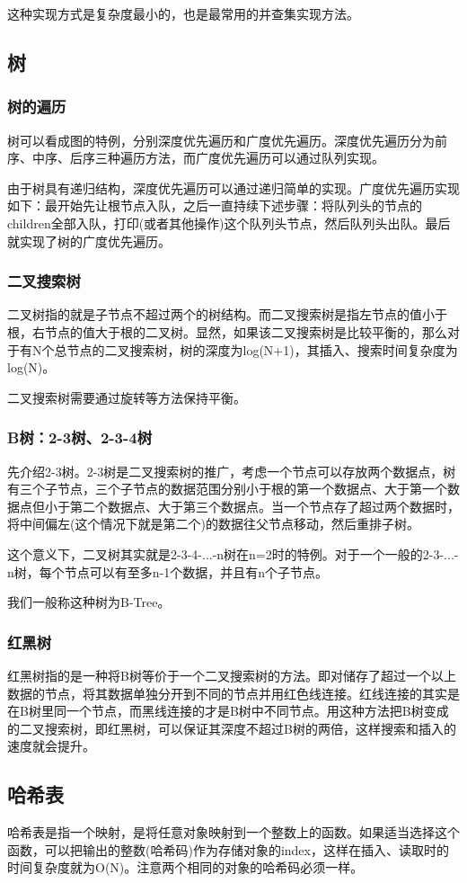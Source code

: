 \documentclass{article}
\begin{document}
	这种实现方式是复杂度最小的，也是最常用的并查集实现方法。
	\subsection{树}
	\subsubsection{树的遍历}
	树可以看成图的特例，分别深度优先遍历和广度优先遍历。深度优先遍历分为前序、中序、后序三种遍历方法，而广度优先遍历可以通过队列实现。
	
	由于树具有递归结构，深度优先遍历可以通过递归简单的实现。广度优先遍历实现如下：最开始先让根节点入队，之后一直持续下述步骤：将队列头的节点的children全部入队，打印(或者其他操作)这个队列头节点，然后队列头出队。最后就实现了树的广度优先遍历。
	\subsubsection{二叉搜索树}
	二叉树指的就是子节点不超过两个的树结构。而二叉搜索树是指左节点的值小于根，右节点的值大于根的二叉树。显然，如果该二叉搜索树是比较平衡的，那么对于有N个总节点的二叉搜索树，树的深度为log(N+1)，其插入、搜索时间复杂度为log(N)。
	
	二叉搜索树需要通过旋转等方法保持平衡。
	\subsubsection{B树：2-3树、2-3-4树}
	先介绍2-3树。2-3树是二叉搜索树的推广，考虑一个节点可以存放两个数据点，树有三个子节点，三个子节点的数据范围分别小于根的第一个数据点、大于第一个数据点但小于第二个数据点、大于第三个数据点。当一个节点存了超过两个数据时，将中间偏左(这个情况下就是第二个)的数据往父节点移动，然后重排子树。
	
	这个意义下，二叉树其实就是2-3-4-...-n树在n=2时的特例。对于一个一般的2-3-...-n树，每个节点可以有至多n-1个数据，并且有n个子节点。
	
	我们一般称这种树为B-Tree。
	
	\subsubsection{红黑树}
	红黑树指的是一种将B树等价于一个二叉搜索树的方法。即对储存了超过一个以上数据的节点，将其数据单独分开到不同的节点并用红色线连接。红线连接的其实是在B树里同一个节点，而黑线连接的才是B树中不同节点。用这种方法把B树变成的二叉搜索树，即红黑树，可以保证其深度不超过B树的两倍，这样搜索和插入的速度就会提升。
	\subsection{哈希表}
	哈希表是指一个映射，是将任意对象映射到一个整数上的函数。如果适当选择这个函数，可以把输出的整数(哈希码)作为存储对象的index，这样在插入、读取时的时间复杂度就为O(N)。注意两个相同的对象的哈希码必须一样。
	
\end{document}
